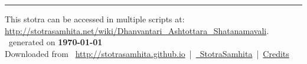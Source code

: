 \documentclass[oneside,12pt]{book}
\begin{document}
\setmainfont[Script=Devanagari,Mapping=tex-text]{Sanskrit 2003}
\fontsize {16}{19.25}\selectfont
\begin{center}

\end{center}
\vfill
\centering
\rule{0.8\textwidth}{0.6pt}

\footnotesize
{}\sffamily
This stotra can be accessed in multiple scripts at:\\
\url{http://stotrasamhita.net/wiki/Dhanvantari_Ashtottara_Shatanamavali}.\\[1ex]
\faFilePdfO~generated on \textbf{\today}\\[1ex]
Downloaded from \faGlobe{}~\url{http://stotrasamhita.github.io}~|~\href{https://github.com/StotraSamhita}{\faGithubSquare{}~StotraSamhita}~|~\href{https://stotrasamhita.github.io/about/}{Credits}
\end{document}
